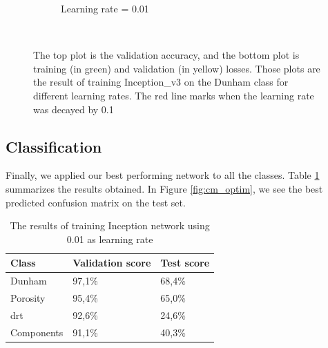 \begin{figure}
{\begin{subfigure}[b]{.6\textwidth}
\caption{Learning rate = 0.01}
\label{fig:optim_001}
\end{subfigure}%
}\\
\caption[Training with different Learning rates]{The top plot is the validation accuracy, and the bottom plot is training (in green) and validation (in yellow) losses. Those plots are the result of training Inception\_v3 on the Dunham class for different learning rates. The red line marks when the learning rate was decayed by 0.1}
\label{fig:optim_plot}
\end{figure}


\subsection{Classification}

Finally, we applied our best performing network to all the classes. Table \ref{tab:optimall} summarizes the results obtained. In Figure \ref{fig:cm_optim}, we see the best predicted confusion matrix on the test set.  

\begin{table}
\caption[Scores of best performing Inception\_v3 with \gls{sgd}]{\label{tab:optimall} The results of training Inception network using 0.01 as learning rate}
\centering
\begin{tabular}[b]{| l | l | l |}
\hline
    Class & Validation score  & Test score\\ \hline
    Dunham  &  97,1\%  & 68,4\% \\ \hline
    Porosity & 95,4\% &  65,0\%\\ \hline
    \gls{drt} & 92,6\% &  24,6\% \\ \hline
    Components & 91,1\% &  40,3\% \\ \hline
\end{tabular} 
\end{table}

